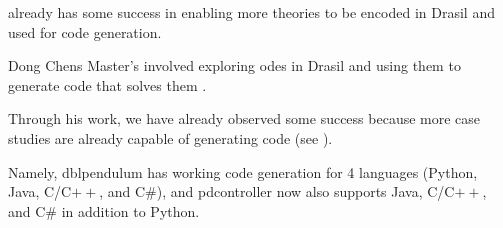 \ModelKind{} already has some success in enabling more theories to be encoded in
Drasil and used for code generation.

Dong Chens Master's involved exploring \acsp{ode} in Drasil and using them to
generate code that solves them \cite{Chen2022MEng}.

Through his work, we have already observed some success because more case
studies are already capable of generating code (see
).

Namely, \acs{dblpendulum} has working code generation for 4 languages (Python,
Java, C/C\(++\), and C\#), and \acs{pdcontroller} now also supports Java,
C/C\(++\), and C\# in addition to Python.

\caseStudiesCodeTableAfterDongsWork{}

